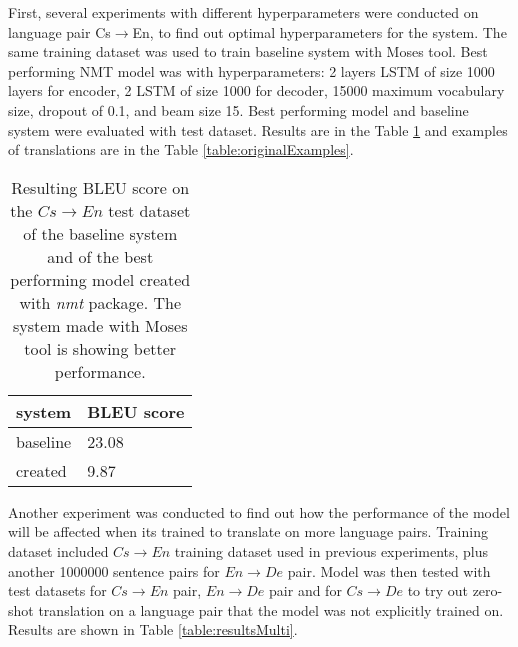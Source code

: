 \documentclass{ExcelAtFIT}
\begin{document}
First, several experiments with different hyperparameters were conducted on language pair Cs$\rightarrow$En, to find out optimal hyperparameters for the system. The same training dataset was used to train baseline system with Moses tool. Best performing NMT model was with hyperparameters: 2 layers LSTM of size 1000 layers for encoder, 2 LSTM of size 1000 for decoder, 15000 maximum vocabulary size, dropout of 0.1, and beam size 15. Best performing model and baseline system were evaluated with test dataset. Results are in the Table \ref{table:results} and examples of translations are in the Table \ref{table:originalExamples}.

\vspace{3mm}

\begin{table}[h!]
    \caption{Resulting BLEU score on the $Cs\rightarrow En$ test dataset of the baseline system and of the best performing model created with \emph{nmt} package. The system made with Moses tool is showing better performance.}
	\label{table:results}
    \begin{center}    	
        \begin{tabular}{ll}
          \toprule
          system & BLEU score \\
          \midrule
          baseline & 23.08  \\
          created  & 9.87 \\
          \bottomrule
        \end{tabular}
    \end{center}
\end{table}

Another experiment was conducted to find out how the performance of the model will be affected when its trained to translate on more language pairs. Training dataset included $Cs\rightarrow En$ training dataset used in previous experiments, plus another 1000000 sentence pairs for $En\rightarrow De$ pair. Model was then tested with test datasets for $Cs\rightarrow En$ pair, $En\rightarrow De$ pair and for $Cs\rightarrow De$ to try out zero-shot translation on a language pair that the model was not explicitly trained on. Results are shown in Table \ref{table:resultsMulti}.
\end{document}
